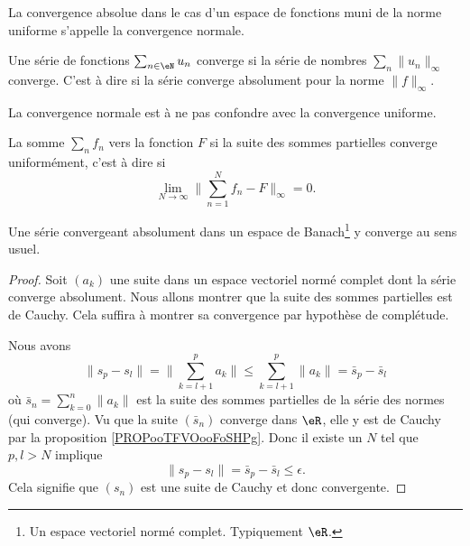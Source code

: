 La convergence absolue dans le cas d'un espace de fonctions muni de la norme uniforme s'appelle la convergence normale.

\begin{definition} \label{DefVBrJUxo}
    Une série de fonctions \( \sum_{n\in \eN}u_n \) converge  si la série de nombres \( \sum_n\| u_n \|_{\infty}\) converge. C'est à dire si la série converge absolument pour la norme \( \| f \|_{\infty}\).
\end{definition}

La convergence normale est à ne pas confondre avec la convergence uniforme. 

\begin{definition}
    La somme \( \sum_nf_n\)  vers la fonction \( F\) si la suite des sommes partielles converge uniformément, c'est à dire si 
    \begin{equation}        \label{EqLNCJooVCTiIw}
        \lim_{N\to \infty} \| \sum_{n=1}^Nf_n-F \|_{\infty}=0.
    \end{equation}
\end{definition}

\begin{proposition} \label{PropAKCusNM}
    Une série convergeant absolument dans un espace de Banach\footnote{Un espace vectoriel normé complet. Typiquement \( \eR\).} y converge au sens usuel.
\end{proposition}

\begin{proof}
    Soit \( (a_k)\) une suite dans un espace vectoriel normé complet dont la série converge absolument. Nous allons montrer que la suite des sommes partielles est de Cauchy. Cela suffira à montrer sa convergence par hypothèse de complétude.

    Nous avons
    \begin{equation}
        \| s_p-s_l \|=\| \sum_{k=l+1}^{p}a_k\|  \leq\sum_{k=l+1}^p\| a_k \|=\bar s_p-\bar s_l
    \end{equation}
    où \( \bar s_n=\sum_{k=0}^n \| a_k \|\) est la suite des sommes partielles de la série des normes (qui converge). Vu que la suite \( (\bar s_n)\) converge dans \( \eR\), elle y est de Cauchy par la proposition \ref{PROPooTFVOooFoSHPg}. Donc il existe un \( N\) tel que \( p,l>N\) implique
    \begin{equation}
        \| s_p-s_l \|=\bar s_p-\bar s_l\leq \epsilon.
    \end{equation}
    Cela signifie que \( (s_n)\) est une suite de Cauchy et donc convergente.
\end{proof}

